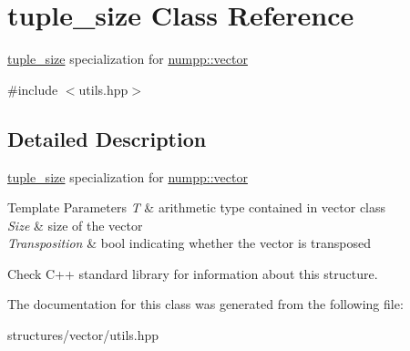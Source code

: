 \hypertarget{classtuple__size}{}\section{tuple\+\_\+size Class Reference}
\label{classtuple__size}


\hyperlink{classtuple__size}{tuple\+\_\+size} specialization for \hyperlink{classnumpp_1_1vector}{numpp\+::vector}  




{\ttfamily \#include $<$utils.\+hpp$>$}



\subsection{Detailed Description}
\hyperlink{classtuple__size}{tuple\+\_\+size} specialization for \hyperlink{classnumpp_1_1vector}{numpp\+::vector} 


\begin{DoxyTemplParams}{Template Parameters}
{\em T} & arithmetic type contained in vector class \\
\hline
{\em Size} & size of the vector \\
\hline
{\em Transposition} & bool indicating whether the vector is transposed\\
\hline
\end{DoxyTemplParams}
Check C++ standard library for information about this structure. 

The documentation for this class was generated from the following file\+:\begin{DoxyCompactItemize}
\item 
structures/vector/utils.\+hpp\end{DoxyCompactItemize}
